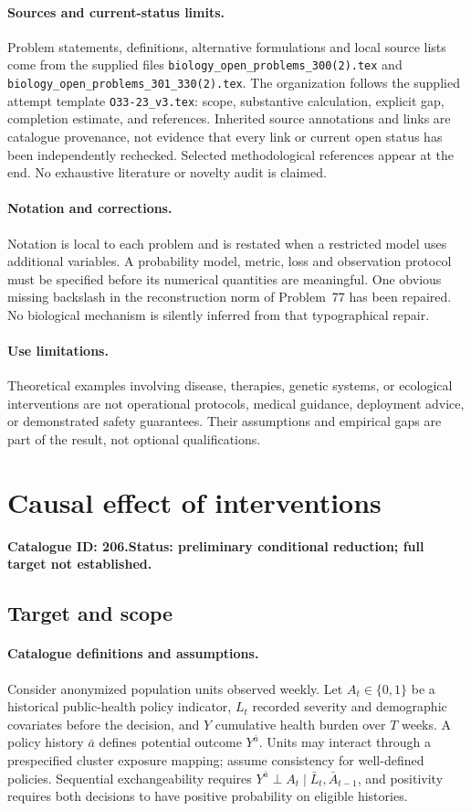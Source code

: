 \documentclass[11pt]{article}
\begin{document}
\paragraph{Sources and current-status limits.}
Problem statements, definitions, alternative formulations and local source lists
come from the supplied files
\texttt{biology\_open\_problems\_300(2).tex} and
\texttt{biology\_open\_problems\_301\_330(2).tex}.
The organization follows the supplied attempt template
\texttt{O33-23\_v3.tex}: scope, substantive calculation, explicit gap,
completion estimate, and references. Inherited source annotations and links are
catalogue provenance, not evidence that every link or current open status has
been independently rechecked. Selected methodological references appear at the
end. No exhaustive literature or novelty audit is claimed.

\paragraph{Notation and corrections.}
Notation is local to each problem and is restated when a restricted model uses
additional variables. A probability model, metric, loss and observation protocol
must be specified before its numerical quantities are meaningful. One obvious
missing backslash in the reconstruction norm of Problem~77 has been repaired.
No biological mechanism is silently inferred from that typographical repair.

\paragraph{Use limitations.}
Theoretical examples involving disease, therapies, genetic systems, or ecological
interventions are not operational protocols, medical guidance, deployment advice,
or demonstrated safety guarantees. Their assumptions and empirical gaps are part
of the result, not optional qualifications.

\setcounter{section}{205}
\section{Causal effect of interventions}
\label{prob:206}
\noindent\textbf{Catalogue ID: 206.}\quad \textbf{Status: preliminary conditional reduction; full target not established.}
\subsection{Target and scope}
\paragraph{Catalogue definitions and assumptions.}
Consider anonymized population units observed weekly. Let $A_t\in\{0,1\}$ be a historical public-health policy indicator, $L_t$ recorded severity and demographic covariates before the decision, and $Y$ cumulative health burden over $T$ weeks. A policy history $\bar a$ defines potential outcome $Y^{\bar a}$. Units may interact through a prespecified cluster exposure mapping; assume consistency for well-defined policies. Sequential exchangeability requires $Y^{\bar a}\perp A_t\mid\bar L_t,\bar A_{t-1}$, and positivity requires both decisions to have positive probability on eligible histories.
\end{document}

